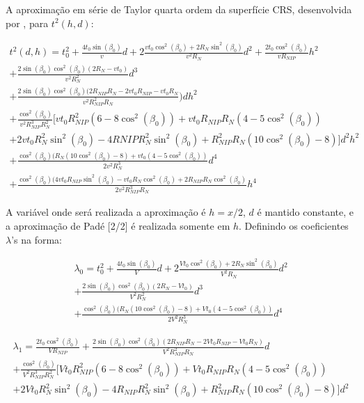 A aproximação em série de Taylor quarta ordem da superfície CRS, desenvolvida por \cite{germam}, para $t^2(h,d)$:


\begin{multline}
\label{eq:6.23}
 t^2(d,h)=t_0^2+\frac{4t_0\sin(\beta_0)}{v}d+2\frac{vt_0\cos^2(\beta_0)+2R_N\sin^2(\beta_0)}{v^2R_N}d^2+\frac{2t_0\cos^2(\beta_0)}{vR_{NIP}}h^2 \\
+\frac{2\sin(\beta_0)\cos^2(\beta_0)(2R_N-vt_0)}{v^2R_N^2}d^3 \\
+\frac{2\sin(\beta_0)\cos^2(\beta_0)(2R_{NIP}R_N-2vt_0R_{NIP}-vt_0R_N}{v^2R_{NIP}^2R_N})dh^2 \\
+\frac{\cos^2(\beta_0)}{v^2R_{NIP}^3R_N^2}[vt_0R_{NIP}^2(6-8\cos^2(\beta_0))+vt_0R_{NIP}R_N(4-5\cos^2(\beta_0)) \\
+2vt_0R_N^2\sin^2(\beta_0)-4R{NIP}R_N^2\sin^2(\beta_0)+R_{NIP}^2R_N(10\cos^2(\beta_0)-8)]d^2h^2 \\ 
+\frac{\cos^2(\beta_0)(R_N(10\cos^2(\beta_0)-8)+vt_0(4-5\cos^2(\beta_0))}{2v^2R_N^3}d^4 \\
+\frac{\cos^2(\beta_0)(4vt_0R_{NIP}\sin^2(\beta_0)-vt_0R_N\cos^2(\beta_0)+2R_{NIP}R_N\cos^2(\beta_0)}{2v^2R_{NIP}^3R_N}h^4
\end{multline}

A variável onde será realizada a aproximação é $h=x/2$,
$d$ é mantido constante, e a aproximação de Padé [2/2] é realizada somente em $h$.
Definindo os coeficientes $\lambda$'s na forma:

\begin{multline}
\label{eq:6.24}
 \lambda_0=t_0^2+\frac{4t_0\sin(\beta_0)}{V}d+2\frac{Vt_0\cos^2(\beta_0)+2R_N\sin^2(\beta_0)}{V^2R_N}d^2 \\
+\frac{2\sin(\beta_0)\cos^2(\beta_0)(2R_N-Vt_0)}{V^2R_N^2}d^3 \\
+\frac{\cos^2(\beta_0)(R_N(10\cos^2(\beta_0)-8)+Vt_0(4-5\cos^2(\beta_0))}{2V^2R_N^3}d^4 
 \end{multline}
 
\begin{multline}
\label{eq:6.25}
 \lambda_1=\frac{2t_0\cos^2(\beta_0)}{VR_{NIP}}+\frac{2\sin(\beta_0)\cos^2(\beta_0)(2R_{NIP}R_N-2Vt_0R_{NIP}-Vt_0R_N)}{V^2R_{NIP}^2R_N}d \\
+\frac{\cos^2(\beta_0)}{V^2R_{NIP}^3R_N^2}[Vt_0R_{NIP}^2(6-8\cos^2(\beta_0))+Vt_0R_{NIP}R_N(4-5\cos^2(\beta_0)) \\
+2Vt_0R_N^2\sin^2(\beta_0)-4R_{NIP}R_N^2\sin^2(\beta_0)+R_{NIP}^2R_N(10\cos^2(\beta_0)-8)]d^2
\end{multline}

